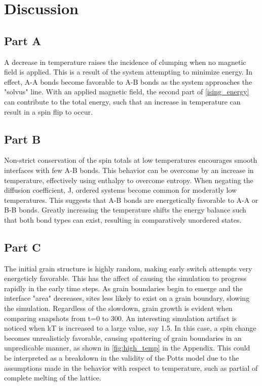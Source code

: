 \documentclass{report}
\begin{document}
    \section{Discussion}
    \subsection{Part A}
        A decrease in temperature raises the incidence of clumping when no magnetic field is applied.  This is a result of the system attempting to minimize energy.  In effect, A-A bonds become favorable to A-B bonds as the system approaches the "solvus" line. With an applied magnetic field, the second part of \eqref{ising_energy} can contribute to the total energy, such that an increase in temperature can result in a spin flip to occur.
    \subsection{Part B}
        Non-strict conservation of the spin totals at low temperatures encourages smooth interfaces with few A-B bonds.  This behavior can be overcome by an increase in temperature, effectively using enthalpy to overcome entropy.  When negating the diffusion coefficient, J, ordered systems become common for moderatly low temperatures.  This suggests that A-B bonds are energetically favorable to A-A or B-B bonds. Greatly increasing the temperature shifts the energy balance such that both bond types can exist, resulting in comparatively unordered states.
    \subsection{Part C}
        The initial grain structure is highly random, making early switch attempts very energeticly favorable.  This has the affect of causing the simulation to progress rapidly in the early time steps.  As grain boundaries begin to emerge and the interface "area" decreases, sites less likely to exist on a grain boundary, slowing the simulation.  Regardless of the slowdown, grain growth is evident when comparing snapshots from t=0 to 300.  An interesting simulation artifact is noticed when kT is increased to a large value, say 1.5.  In this case, a spin change becomes unrealisticly favorable, causing spattering of grain boundaries in an unpredicable manner, as shown in \ref{fig:high_temp} in the Appendix. This could be interpreted as a breakdown in the validity of the Potts model due to the assumptions made in the behavior with respect to temperature, such as partial of complete melting of the lattice.
\end{document}
